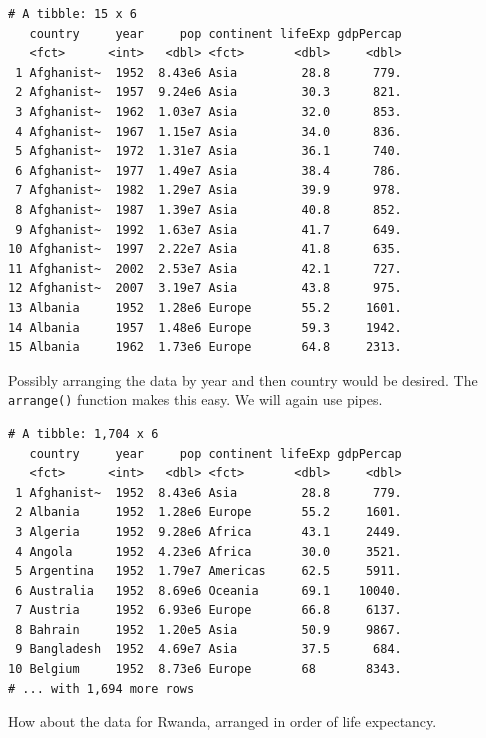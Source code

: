 \documentclass[]{krantz}
\makeatletter
\newenvironment{Shaded}{\begin{snugshade}}{\end{snugshade}}
\newcommand{\KeywordTok}[1]{\textcolor[rgb]{0.27,0.27,0.27}{\textbf{#1}}}
\newcommand{\StringTok}[1]{\textcolor[rgb]{0.5,0.5,0.5}{#1}}
\newcommand{\OperatorTok}[1]{\textcolor[rgb]{0.43,0.43,0.43}{\textbf{#1}}}
\newcommand{\NormalTok}[1]{#1}
\newenvironment{kframe}{%
\medskip{}
\setlength{\fboxsep}{.8em}
 \def\at@end@of@kframe{}%
 \ifinner\ifhmode%
  \def\at@end@of@kframe{\end{minipage}}%
  \begin{minipage}{\columnwidth}%
 \fi\fi%
 \def\FrameCommand##1{\hskip\@totalleftmargin \hskip-\fboxsep
 \colorbox{shadecolor}{##1}\hskip-\fboxsep
     \hskip-\linewidth \hskip-\@totalleftmargin \hskip\columnwidth}%
 \MakeFramed {\advance\hsize-\width
   \@totalleftmargin\z@ \linewidth\hsize
   \@setminipage}}%
 {\par\unskip\endMakeFramed%
 \at@end@of@kframe}
\renewenvironment{Shaded}{\begin{kframe}}{\end{kframe}}
\makeatother
\begin{document}
\begin{verbatim}
# A tibble: 15 x 6
   country     year     pop continent lifeExp gdpPercap
   <fct>      <int>   <dbl> <fct>       <dbl>     <dbl>
 1 Afghanist~  1952  8.43e6 Asia         28.8      779.
 2 Afghanist~  1957  9.24e6 Asia         30.3      821.
 3 Afghanist~  1962  1.03e7 Asia         32.0      853.
 4 Afghanist~  1967  1.15e7 Asia         34.0      836.
 5 Afghanist~  1972  1.31e7 Asia         36.1      740.
 6 Afghanist~  1977  1.49e7 Asia         38.4      786.
 7 Afghanist~  1982  1.29e7 Asia         39.9      978.
 8 Afghanist~  1987  1.39e7 Asia         40.8      852.
 9 Afghanist~  1992  1.63e7 Asia         41.7      649.
10 Afghanist~  1997  2.22e7 Asia         41.8      635.
11 Afghanist~  2002  2.53e7 Asia         42.1      727.
12 Afghanist~  2007  3.19e7 Asia         43.8      975.
13 Albania     1952  1.28e6 Europe       55.2     1601.
14 Albania     1957  1.48e6 Europe       59.3     1942.
15 Albania     1962  1.73e6 Europe       64.8     2313.
\end{verbatim}

Possibly arranging the data by year and then country would be desired.
The \texttt{arrange()} function makes this easy. We will again use
pipes.

\begin{Shaded}
\end{Shaded}

\begin{verbatim}
# A tibble: 1,704 x 6
   country     year     pop continent lifeExp gdpPercap
   <fct>      <int>   <dbl> <fct>       <dbl>     <dbl>
 1 Afghanist~  1952  8.43e6 Asia         28.8      779.
 2 Albania     1952  1.28e6 Europe       55.2     1601.
 3 Algeria     1952  9.28e6 Africa       43.1     2449.
 4 Angola      1952  4.23e6 Africa       30.0     3521.
 5 Argentina   1952  1.79e7 Americas     62.5     5911.
 6 Australia   1952  8.69e6 Oceania      69.1    10040.
 7 Austria     1952  6.93e6 Europe       66.8     6137.
 8 Bahrain     1952  1.20e5 Asia         50.9     9867.
 9 Bangladesh  1952  4.69e7 Asia         37.5      684.
10 Belgium     1952  8.73e6 Europe       68       8343.
# ... with 1,694 more rows
\end{verbatim}

How about the data for Rwanda, arranged in order of life expectancy.
\end{document}
